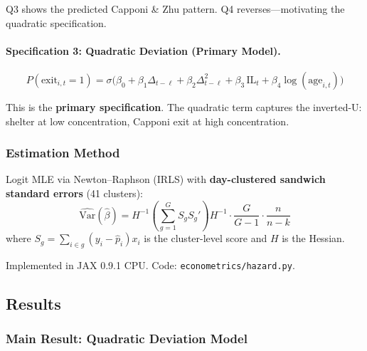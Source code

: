 Q3 shows the predicted Capponi \& Zhu pattern. Q4 reverses---motivating the
quadratic specification.

\paragraph{Specification 3: Quadratic Deviation (Primary Model).}
\begin{equation}\label{eq:quadratic-hazard-full}
  \boxed{P(\text{exit}_{i,t} = 1) = \sigma\bigl(
    \beta_0 + \beta_1 \Delta_{t-\ell} + \beta_2 \Delta_{t-\ell}^2
    + \beta_3 \,\text{IL}_t + \beta_4 \log(\text{age}_{i,t})
  \bigr)}
\end{equation}

This is the \textbf{primary specification}. The quadratic term captures the
inverted-U: shelter at low concentration, Capponi exit at high concentration.

\subsubsection{Estimation Method}

Logit MLE via Newton--Raphson (IRLS) with \textbf{day-clustered sandwich
standard errors} (41 clusters):
\begin{equation}\label{eq:clustered-var}
  \widehat{\text{Var}}(\hat{\beta}) = H^{-1}
    \left(\sum_{g=1}^{G} S_g S_g'\right)
    H^{-1} \cdot \frac{G}{G-1} \cdot \frac{n}{n-k}
\end{equation}
where $S_g = \sum_{i \in g} (y_i - \hat{p}_i) x_i$ is the cluster-level score
and $H$ is the Hessian.

Implemented in JAX 0.9.1 CPU. Code: \texttt{econometrics/hazard.py}.


\subsection{Results}\label{subsec:econ-results}

\subsubsection{Main Result: Quadratic Deviation Model}

